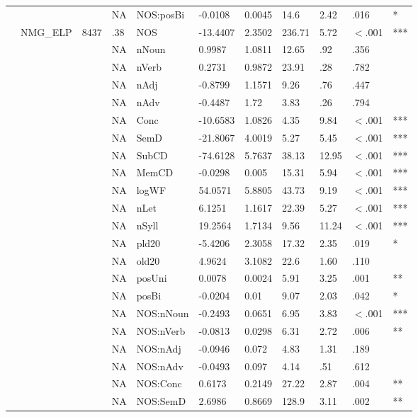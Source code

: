 \begin{table}[ht]
\begin{tabular}{lllllllllll}
   &  &  & NA & NOS:posBi & -0.0108 & 0.0045 & 14.6 & 2.42 & .016 & * \\ 
   & NMG\_ELP & 8437 & .38 & NOS & -13.4407 & 2.3502 & 236.71 & 5.72 & $<$.001 & *** \\ 
   &  &  & NA & nNoun & 0.9987 & 1.0811 & 12.65 & .92 & .356 &   \\ 
   &  &  & NA & nVerb & 0.2731 & 0.9872 & 23.91 & .28 & .782 &   \\ 
   &  &  & NA & nAdj & -0.8799 & 1.1571 & 9.26 & .76 & .447 &   \\ 
   &  &  & NA & nAdv & -0.4487 & 1.72 & 3.83 & .26 & .794 &   \\ 
   &  &  & NA & Conc & -10.6583 & 1.0826 & 4.35 & 9.84 & $<$.001 & *** \\ 
   &  &  & NA & SemD & -21.8067 & 4.0019 & 5.27 & 5.45 & $<$.001 & *** \\ 
   &  &  & NA & SubCD & -74.6128 & 5.7637 & 38.13 & 12.95 & $<$.001 & *** \\ 
   &  &  & NA & MemCD & -0.0298 & 0.005 & 15.31 & 5.94 & $<$.001 & *** \\ 
   &  &  & NA & logWF & 54.0571 & 5.8805 & 43.73 & 9.19 & $<$.001 & *** \\ 
   &  &  & NA & nLet & 6.1251 & 1.1617 & 22.39 & 5.27 & $<$.001 & *** \\ 
   &  &  & NA & nSyll & 19.2564 & 1.7134 & 9.56 & 11.24 & $<$.001 & *** \\ 
   &  &  & NA & pld20 & -5.4206 & 2.3058 & 17.32 & 2.35 & .019 & * \\ 
   &  &  & NA & old20 & 4.9624 & 3.1082 & 22.6 & 1.60 & .110 &   \\ 
   &  &  & NA & posUni & 0.0078 & 0.0024 & 5.91 & 3.25 & .001 & ** \\ 
   &  &  & NA & posBi & -0.0204 & 0.01 & 9.07 & 2.03 & .042 & * \\ 
   &  &  & NA & NOS:nNoun & -0.2493 & 0.0651 & 6.95 & 3.83 & $<$.001 & *** \\ 
   &  &  & NA & NOS:nVerb & -0.0813 & 0.0298 & 6.31 & 2.72 & .006 & ** \\ 
   &  &  & NA & NOS:nAdj & -0.0946 & 0.072 & 4.83 & 1.31 & .189 &   \\ 
   &  &  & NA & NOS:nAdv & -0.0493 & 0.097 & 4.14 & .51 & .612 &   \\ 
   &  &  & NA & NOS:Conc & 0.6173 & 0.2149 & 27.22 & 2.87 & .004 & ** \\ 
   &  &  & NA & NOS:SemD & 2.6986 & 0.8669 & 128.9 & 3.11 & .002 & ** \\ 

\end{tabular}
\end{table}
